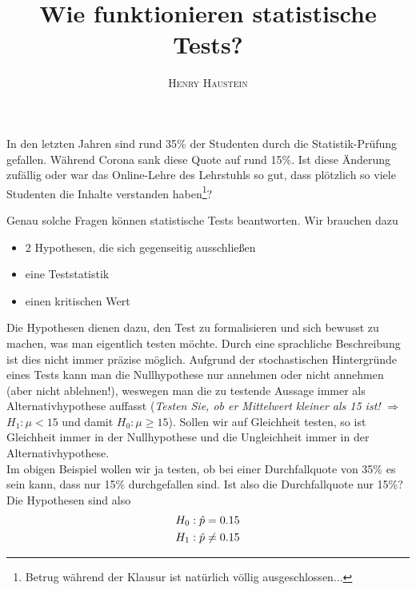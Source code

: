 \documentclass{article}
\title{\textbf{Wie funktionieren statistische Tests?}}
\author{\textsc{Henry Haustein}}
\date{}
\begin{document}
	\maketitle
	
	In den letzten Jahren sind rund 35\% der Studenten durch die Statistik-Prüfung gefallen. Während Corona sank diese Quote auf rund 15\%. Ist diese Änderung zufällig oder war das Online-Lehre des Lehrstuhls so gut, dass plötzlich so viele Studenten die Inhalte verstanden haben\footnote{Betrug während der Klausur ist natürlich völlig ausgeschlossen...}?
	
	Genau solche Fragen können statistische Tests beantworten. Wir brauchen dazu
	\begin{itemize}
		\item 2 Hypothesen, die sich gegenseitig ausschließen
		\item eine Teststatistik
		\item einen kritischen Wert
	\end{itemize}

	Die Hypothesen dienen dazu, den Test zu formalisieren und sich bewusst zu machen, was man eigentlich testen möchte. Durch eine sprachliche Beschreibung ist dies nicht immer präzise möglich. Aufgrund der stochastischen Hintergründe eines Tests kann man die Nullhypothese nur annehmen oder nicht annehmen (aber nicht ablehnen!), weswegen man die zu testende Aussage immer als Alternativhypothese auffasst (\textit{Testen Sie, ob er Mittelwert kleiner als 15 ist!} $\Rightarrow$ $H_1: \mu < 15$ und damit $H_0: \mu \ge 15$). Sollen wir auf Gleichheit testen, so ist Gleichheit immer in der Nullhypothese und die Ungleichheit immer in der Alternativhypothese. \\
	Im obigen Beispiel wollen wir ja testen, ob bei einer Durchfallquote von 35\% es sein kann, dass nur 15\% durchgefallen sind. Ist also die Durchfallquote nur 15\%? Die Hypothesen sind also
	\begin{align}
		H_0: \hat{p} &= 0.15 \notag \\
		H_1: \hat{p} &\neq 0.15 \notag
	\end{align}
	
\end{document}
